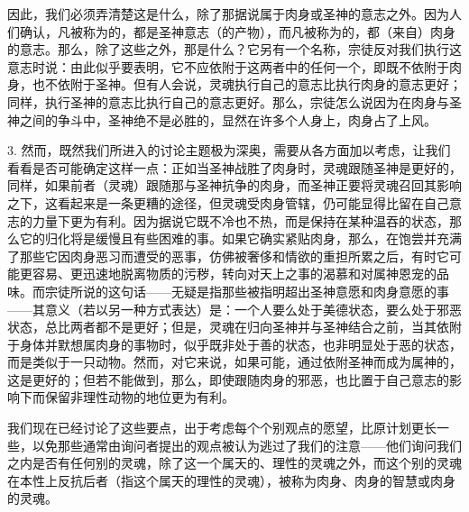 因此，我们必须弄清楚这是什么，除了那据说属于肉身或圣神的意志之外。因为人们确认，凡被称为的，都是圣神意志（的产物），而凡被称为的，都（来自）肉身的意志。那么，除了这些之外，那是什么？它另有一个名称，宗徒反对我们执行这意志时说：由此似乎要表明，它不应依附于这两者中的任何一个，即既不依附于肉身，也不依附于圣神。但有人会说，灵魂执行自己的意志比执行肉身的意志更好；同样，执行圣神的意志比执行自己的意志更好。那么，宗徒怎么说因为在肉身与圣神之间的争斗中，圣神绝不是必胜的，显然在许多个人身上，肉身占了上风。\par

3. 然而，既然我们所进入的讨论主题极为深奥，需要从各方面加以考虑，让我们看看是否可能确定这样一点：正如当圣神战胜了肉身时，灵魂跟随圣神是更好的，同样，如果前者（灵魂）跟随那与圣神抗争的肉身，而圣神正要将灵魂召回其影响之下，这看起来是一条更糟的途径，但灵魂受肉身管辖，仍可能显得比留在自己意志的力量下更为有利。因为据说它既不冷也不热，而是保持在某种温吞的状态，那么它的归化将是缓慢且有些困难的事。如果它确实紧贴肉身，那么，在饱尝并充满了那些它因肉身恶习而遭受的恶事，仿佛被奢侈和情欲的重担所累之后，有时它可能更容易、更迅速地脱离物质的污秽，转向对天上之事的渴慕和对属神恩宠的品味。而宗徒所说的这句话——无疑是指那些被指明超出圣神意愿和肉身意愿的事——其意义（若以另一种方式表达）是：一个人要么处于美德状态，要么处于邪恶状态，总比两者都不是更好；但是，灵魂在归向圣神并与圣神结合之前，当其依附于身体并默想属肉身的事物时，似乎既非处于善的状态，也非明显处于恶的状态，而是类似于一只动物。然而，对它来说，如果可能，通过依附圣神而成为属神的，这是更好的；但若不能做到，那么，即使跟随肉身的邪恶，也比置于自己意志的影响下而保留非理性动物的地位更为有利。\par

我们现在已经讨论了这些要点，出于考虑每个个别观点的愿望，比原计划更长一些，以免那些通常由询问者提出的观点被认为逃过了我们的注意——他们询问我们之内是否有任何别的灵魂，除了这一个属天的、理性的灵魂之外，而这个别的灵魂在本性上反抗后者（指这个属天的理性的灵魂），被称为肉身、肉身的智慧或肉身的灵魂。\par


